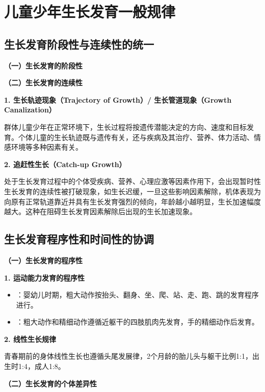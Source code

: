 \section{儿童少年生长发育一般规律}

\subsection{生长发育阶段性与连续性的统一}

\begin{keybox}
\textbf{（一）生长发育的阶段性}

\textbf{（二）生长发育的连续性}

\textbf{1. 生长轨迹现象（Trajectory of Growth）/ 生长管道现象（Growth Canalization）}

群体儿童少年在正常环境下，生长过程将按遗传潜能决定的方向、速度和目标发育。个体儿童的生长轨迹既与遗传有关，还与疾病及其治疗、营养、体力活动、情感环境等多种因素有关。

\textbf{2. 追赶性生长（Catch-up Growth）}

处于生长发育过程中的个体受疾病、营养、心理应激等因素作用下，会出现暂时性生长发育的连续性被打破现象，如生长迟缓，一旦这些影响因素解除，机体表现为向原有正常轨道靠近并具有生长发育强烈的倾向，年龄越小越明显，生长加速幅度越大。这种在阻碍生长发育因素解除后出现的生长加速现象。
\end{keybox}

\subsection{生长发育程序性和时间性的协调}

\begin{keybox}
\textbf{（一）生长发育的程序性}

\textbf{1. 运动能力发育的程序性}

\begin{itemize}[leftmargin=*]
    \item {}：婴幼儿时期，粗大动作按抬头、翻身、坐、爬、站、走、跑、跳的发育程序进行。
    \item {}：粗大动作和精细动作遵循近躯干的四肢肌肉先发育，手的精细动作后发育。
\end{itemize}

\textbf{2. 线性生长规律}

青春期前的身体线性生长也遵循头尾发展律，2个月龄的胎儿头与躯干比例1:1，出生时1:4，成人1:8。

\textbf{（二）生长发育的个体差异性}
\end{keybox}


